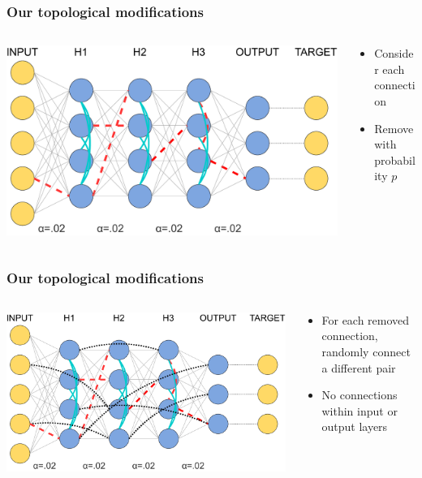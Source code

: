 \documentclass[pdf]{beamer}
\begin{document}
\begin{frame}
	\frametitle{Our topological modifications}
	\begin{columns}
		\begin{column}{.6\textwidth}
			\includegraphics[width=\textwidth]{figures/topology_changes_step3.pdf}
		\end{column}
		\begin{column}{.4\textwidth}
			\begin{itemize}
			\item Consider each connection
			\item Remove with probability $p$
			\end{itemize}
		\end{column}
	\end{columns}
\end{frame}
\begin{frame}
	\frametitle{Our topological modifications}
	\begin{columns}
		\begin{column}{.6\textwidth}
			\includegraphics[width=\textwidth]{figures/topology_changes_step4.pdf}
		\end{column}
		\begin{column}{.4\textwidth}
			\begin{itemize}
			\item For each removed connection, randomly connect a different pair
			\item No connections within input or output layers
			\end{itemize}
		\end{column}
	\end{columns}
\end{frame}
\end{document}
